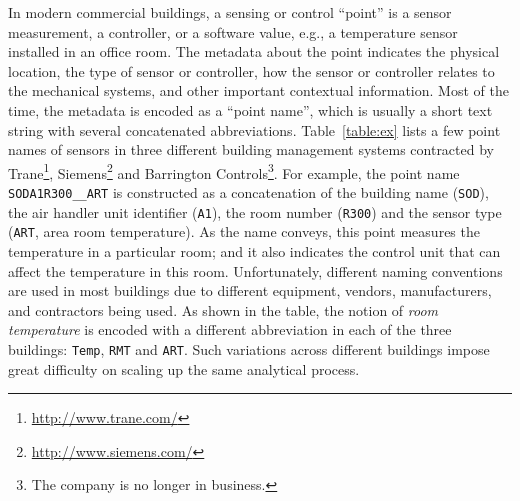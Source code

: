 In modern commercial buildings, a sensing or control ``point'' is a sensor
measurement, a controller, or a software value, e.g., a temperature sensor
installed in an office room. The metadata about the point indicates the physical
location, the type of sensor or controller, how the sensor or controller relates
to the mechanical systems, and other important contextual information. Most of
the time, the metadata is encoded as a ``point name'', which is usually a short
text string with several concatenated abbreviations. Table~\ref{table:ex} lists 
a few point names of sensors in three different building management systems contracted 
by Trane\footnote{\url{http://www.trane.com/}}, Siemens\footnote{\url{http://www.siemens.com/}} 
and Barrington Controls\footnote{The company is no longer in business.}. 
For example, the point name \texttt{SODA1R300\_\_ART} is constructed as a
concatenation of the building name (\texttt{SOD}), the air handler unit
identifier (\texttt{A1}), the room number (\texttt{R300}) and the sensor type
(\texttt{ART}, area room temperature). As the name conveys, this point measures 
the temperature in a particular room; and it also indicates the control unit that 
can affect the temperature in this room. Unfortunately, different naming conventions 
are used in most buildings due to different equipment, vendors, manufacturers, 
and contractors being used. As shown in the table, the notion of {\em room temperature} is encoded with a different abbreviation in each of the three buildings: \texttt{Temp}, \texttt{RMT} and \texttt{ART}.
Such variations across different buildings impose great difficulty on scaling up the same analytical process.



